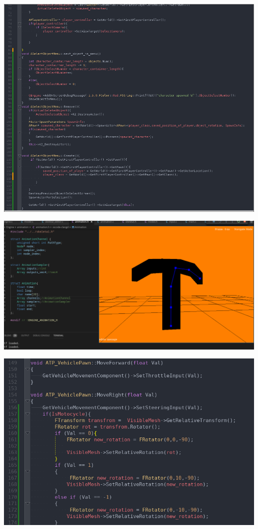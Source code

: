 \documentclass{article}
\begin{document}
  \includegraphics[width=\textwidth]{50.png}

  \includegraphics[width=\textwidth]{51.png}
  
  \includegraphics[width=\textwidth]{52.png}
\end{document}
